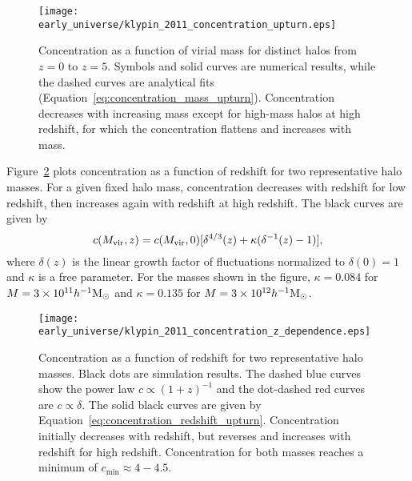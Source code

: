 \begin{figure}[ht]
	\centering
	\texttt{[image: early\_universe/klypin\_2011\_concentration\_upturn.eps]}
	\caption[Concentration upturn for high mass halos at high $z$]{\footnotesize Concentration as a function of virial mass for distinct halos from $z = 0$ to $z = 5$.  Symbols and solid curves are numerical results, while the dashed curves are analytical fits (Equation~\ref{eq:concentration_mass_upturn}).  Concentration decreases with increasing mass except for high-mass halos at high redshift, for which the concentration flattens and increases with mass.  \citep{2011ApJ...740..102K}}
	\label{fig:concentration--klypin_concentration_upturn}
\end{figure}

Figure~\ref{fig:concentration--klypin_concentration_z_dependence} plots concentration as a function of redshift for two representative halo masses.  For a given fixed halo mass, concentration decreases with redshift for low redshift, then increases again with redshift at high redshift.  The black curves are given by
\begin{equation} \label{eq:concentration_redshift_upturn}
	c({M_{\mathrm{vir}}}, z) = c({M_{\mathrm{vir}}}, 0) [\delta^{4/3}(z) + \kappa(\delta^{-1}(z) - 1)],
\end{equation}
where $\delta(z)$ is the linear growth factor of fluctuations normalized to $\delta(0) = 1$ and $\kappa$ is a free parameter.  For the masses shown in the figure, $\kappa = 0.084$ for $M = 3 \times 10^{11} h^{-1} {\rm M_\odot}$ and $\kappa = 0.135$ for $M = 3 \times 10^{12} h^{-1} {\rm M_\odot}$.

\begin{figure}[ht]
	\centering
	\texttt{[image: early\_universe/klypin\_2011\_concentration\_z\_dependence.eps]}
	\caption[Evolution of concentration with redshift for two halo masses]{\footnotesize Concentration as a function of redshift for two representative halo masses.  Black dots are simulation results.  The dashed blue curves show the power law $c \propto (1 + z)^{-1}$ and the dot-dashed red curves are $c \propto \delta$.  The solid black curves are given by Equation~\ref{eq:concentration_redshift_upturn}.  Concentration initially decreases with redshift, but reverses and increases with redshift for high redshift.  Concentration for both masses reaches a minimum of $c_{\min} \approx 4-4.5$. \citep{2011ApJ...740..102K}}
	\label{fig:concentration--klypin_concentration_z_dependence}
\end{figure}

